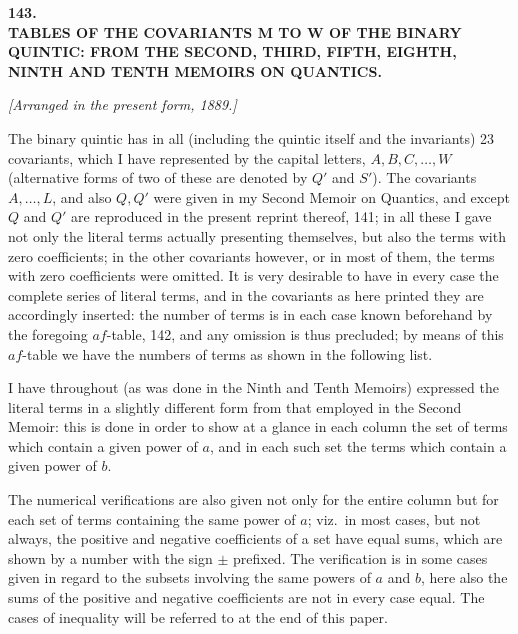 \documentclass[11pt]{article}
\begin{document}

\bigskip\bigskip
\begin{center}
{\Large\bfseries 143.}\\[1ex]
{\large\bfseries TABLES OF THE COVARIANTS M TO W OF THE BINARY QUINTIC: FROM THE SECOND, THIRD, FIFTH, EIGHTH, NINTH AND TENTH MEMOIRS ON QUANTICS.}
\end{center}

\noindent\textit{[Arranged in the present form, 1889.]}

\medskip

\noindent The binary quintic has in all (including the quintic itself and the invariants) 23 covariants, which I have represented by the capital letters, $A, B, C, \ldots, W$ (alternative forms of two of these are denoted by $Q'$ and $S'$). The covariants $A, \ldots, L$, and also $Q, Q'$ were given in my Second Memoir on Quantics, and except $Q$ and $Q'$ are reproduced in the present reprint thereof, 141; in all these I gave not only the literal terms actually presenting themselves, but also the terms with zero coefficients; in the other covariants however, or in most of them, the terms with zero coefficients were omitted. It is very desirable to have in every case the complete series of literal terms, and in the covariants as here printed they are accordingly inserted: the number of terms is in each case known beforehand by the foregoing $af$-table, 142, and any omission is thus precluded; by means of this $af$-table we have the numbers of terms as shown in the following list.

I have throughout (as was done in the Ninth and Tenth Memoirs) expressed the literal terms in a slightly different form from that employed in the Second Memoir: this is done in order to show at a glance in each column the set of terms which contain a given power of $a$, and in each such set the terms which contain a given power of $b$.

The numerical verifications are also given not only for the entire column but for each set of terms containing the same power of $a$; viz.\ in most cases, but not always, the positive and negative coefficients of a set have equal sums, which are shown by a number with the sign $\pm$ prefixed. The verification is in some cases given in regard to the subsets involving the same powers of $a$ and $b$, here also the sums of the positive and negative coefficients are not in every case equal. The cases of inequality will be referred to at the end of this paper.
\end{document}
